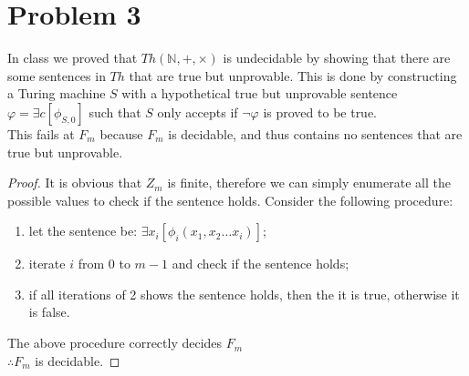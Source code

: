 \documentclass[letterpaper]{article}
\begin{document}
\section*{Problem 3}

In class we proved that $ Th(\mathbb{N}, +, \times) $ is undecidable
by showing that there are some sentences in $ Th $ that are true but
unprovable. This is done by constructing a Turing machine $S$ with a hypothetical
true but unprovable sentence $\varphi = \exists c [\phi_{S,0}] $ such that $S$ only accepts if $ \lnot \varphi $
is proved to be true.\\

This fails at $F_{m}$ because $F_{m}$ is decidable, and thus contains no sentences that are true but unprovable.
\begin{proof}
It is obvious that $Z_m$ is finite, therefore we can simply enumerate all the possible
values to check if the sentence holds. Consider the following procedure:
\begin{enumerate}
    \item let the sentence be: $ \exists x_i[\phi_i(x_1,x_2\dots x_i)] $;
    \item iterate $i$ from $ 0 $ to $ m-1 $ and check if the sentence holds;
    \item if all iterations of 2 shows the sentence holds, then the it is true, otherwise it is false.
\end{enumerate}
The above procedure correctly decides $F_m$\\
$ \therefore F_m $ is decidable.
\end{proof}
\end{document}
